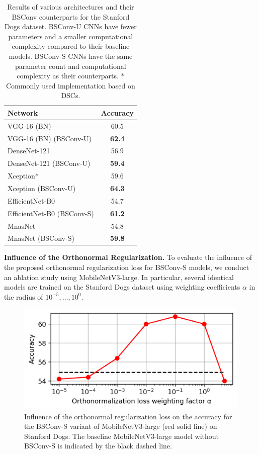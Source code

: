 \documentclass[10pt,twocolumn,letterpaper]{article}
\newcommand{\DCCK}{BSConv\xspace}
\newcommand{\DCCKU}{\DCCK-U\xspace}
\newcommand{\DCCKS}{\DCCK-S\xspace}
\begin{document}
\begin{table}
	\begin{center}
		\begin{tabular}{|l|c|}
			\hline
			Network & Accuracy \\
			\hline
			VGG-16 (BN) \cite{simonyan2014very}	& 60.5 \\
			VGG-16 (BN) (\DCCKU) 				& \bf{62.4} \\
			\hline
			DenseNet-121 \cite{huang2017densely}	& 56.9 \\
			DenseNet-121 (\DCCKU) 				& \bf{59.4} \\
			\hline
			Xception* \cite{chollet2017xception}	& 59.6 \\
			Xception (\DCCKU) 					& \bf{64.3} \\
			\hline
			EfficientNet-B0 \cite{tan2019efficientnet}	& 54.7 \\
			EfficientNet-B0 (\DCCKS)				& \bf{61.2} \\
			\hline
			MnasNet \cite{tan2019mnasnet}			& 54.8 \\
			MnasNet (\DCCKS)						& \bf{59.8} \\
			\hline
			\end{tabular}
		\end{center}
	\caption{%
		Results of various architectures and their \DCCK counterparts for the Stanford Dogs dataset.
		\DCCKU CNNs have fewer parameters and a smaller computational complexity compared to their baseline models.
		\DCCKS CNNs have the same parameter count and computational complexity as their counterparts.
		* Commonly used implementation based on DSCs.
	}
	\label{tab:dogsOthers}
\end{table}

\textbf{Influence of the Orthonormal Regularization.}
To evaluate the influence of the proposed orthonormal regularization loss for \DCCKS models, we conduct an ablation study using MobileNetV3-large.
In particular, several identical models are trained on the Stanford Dogs dataset using weighting coefficients $\alpha$ in the radius of $10^{-5}, \ldots, 10^{0}$.

\begin{figure}
	\center
	\includegraphics[width=1.0\columnwidth]{images/dcckv2-alpha.png}
	\caption{%
		Influence of the orthonormal regularization loss on the accuracy for the \DCCKS variant of MobileNetV3-large (red solid line) on Stanford Dogs.
		The baseline MobileNetV3-large model without \DCCKS is indicated by the black dashed line.
	}
     \label{fig:dcckV2Alpha}
\end{figure}
\end{document}

